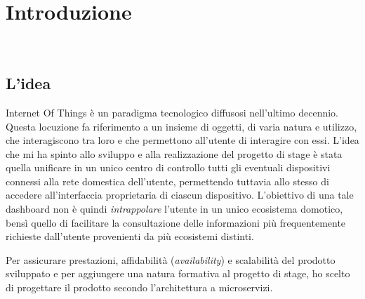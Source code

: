 
\chapter{Introduzione}
\label{cap:introduzione}

\\

% 
% 

\section{L'idea}

Internet Of Things è un paradigma tecnologico diffusosi nell'ultimo decennio. Questa locuzione fa riferimento a un insieme di oggetti,
di varia natura e utilizzo, che interagiscono tra loro e che permettono all'utente di interagire con essi.
L'idea che mi ha spinto allo sviluppo e alla realizzazione del progetto di stage è stata quella unificare in un unico centro di controllo
tutti gli eventuali dispositivi connessi alla rete domestica dell'utente, permettendo 
tuttavia allo stesso di accedere all'interfaccia proprietaria di ciascun dispositivo.
L'obiettivo di una tale dashboard non è quindi \textit{intrappolare} l'utente in un unico ecosistema domotico, 
bensì quello di facilitare la consultazione delle informazioni più frequentemente richieste dall'utente provenienti da più ecosistemi distinti.

Per assicurare prestazioni, affidabilità (\textit{availability}) e scalabilità del prodotto sviluppato e per aggiungere una natura formativa al progetto di stage,
ho scelto di progettare il prodotto secondo l'architettura a microservizi.

